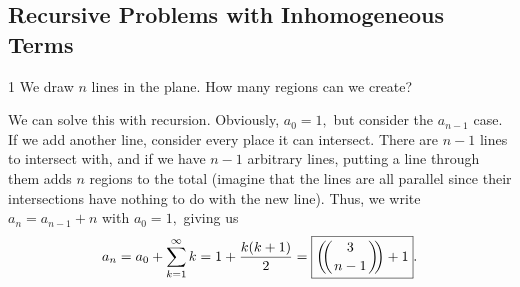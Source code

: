 \label{23-0326}

% 





% 



\noindent

\subsection{Recursive Problems with Inhomogeneous Terms}

\begin{problem}1
    We draw $n$ lines in the plane. How many regions can we create?
\end{problem}

\begin{solution}
    We can solve this with recursion. Obviously, $a_0=1,$ but consider the $a_{n-1}$ case. If we add another line, consider every place it can intersect. There are $n-1$ lines to intersect with, and if we have $n-1$ arbitrary lines, putting a line through them adds $n$ regions to the total (imagine that the lines are all parallel since their intersections have nothing to do with the new line). Thus, we write $a_n=a_{n-1}+n$ with $a_0=1,$ giving us $$a_n=a_0+\sum_{k=1}^{\infty}k=1+\frac{k (k+1)}{2}=\boxed{\multiset{3}{n-1}+1}.$$
\end{solution}

